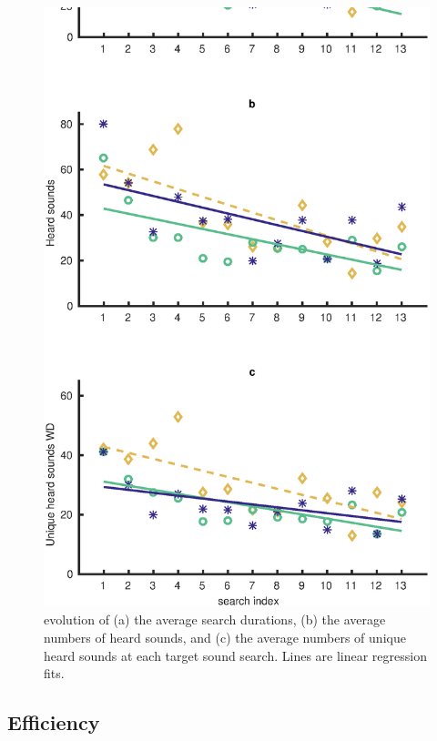 \documentclass{aes2e}
\begin{document}
\begin{figure}[t]
\begin{center}
\includegraphics[scale=0.4]{gfx/analyse_urban2.eps} 
\end{center}
\caption{\label{fig2} evolution of (a) the average search durations, (b) the average numbers of heard sounds, and (c) the average numbers of unique heard sounds at each target sound search. Lines are linear regression fits.}
\end{figure}


\subsection{Efficiency}
\end{document}
